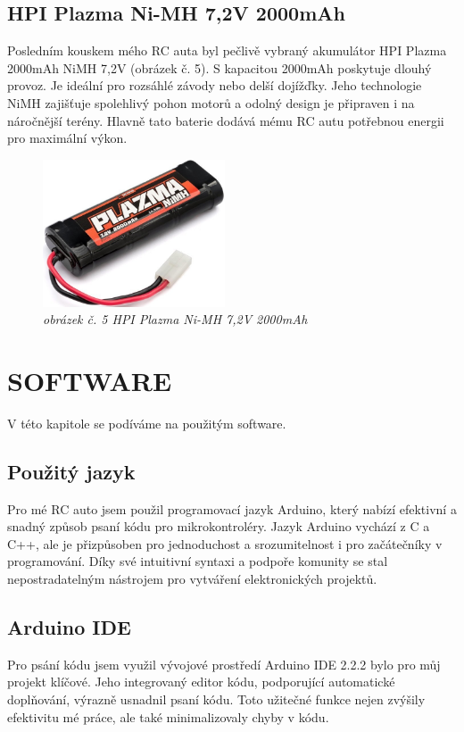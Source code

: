 \documentclass[12pt, a4paper,
oneside,      %
openany
]{report}
\begin{document}
\subsection{HPI Plazma Ni-MH 7,2V 2000mAh}
\noindent Posledním kouskem mého RC auta byl pečlivě vybraný akumulátor HPI Plazma 2000mAh NiMH 7,2V (obrázek č. 5). S kapacitou 2000mAh poskytuje dlouhý provoz. Je ideální pro rozsáhlé závody nebo delší dojížďky. Jeho technologie NiMH zajišťuje spolehlivý pohon motorů a odolný design je připraven i na náročnější terény. Hlavně tato baterie dodává mému RC autu potřebnou energii pro maximální výkon.
\begin{figure}[H]
        \centering
		\includegraphics[width=0.48\textwidth]{image/akumulator.png}
        \caption*{\textit{obrázek č. 5 HPI Plazma Ni-MH 7,2V 2000mAh}}
        \label{fig:akumulator}
    \end{figure}

\section{SOFTWARE}
\noindent V této kapitole se podíváme na použitým software.

\subsection{Použitý jazyk}
\noindent Pro mé RC auto jsem použil programovací jazyk Arduino, který nabízí efektivní a snadný způsob psaní kódu pro mikrokontroléry. Jazyk Arduino vychází z C a C++, ale je přizpůsoben pro jednoduchost a srozumitelnost i pro začátečníky v programování. Díky své intuitivní syntaxi a podpoře komunity se stal nepostradatelným nástrojem pro vytváření elektronických projektů.

\subsection{Arduino IDE}
\noindent Pro psání kódu jsem využil vývojové prostředí Arduino IDE 2.2.2 bylo pro můj projekt klíčové. Jeho integrovaný editor kódu, podporující automatické doplňování, výrazně usnadnil psaní kódu. Toto užitečné funkce nejen zvýšily efektivitu mé práce, ale také minimalizovaly chyby v kódu. 
\end{document}
